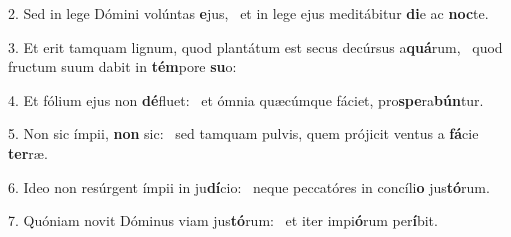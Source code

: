 2. Sed in lege Dómini volúntas \textbf{e}jus, \ast\  et in lege ejus meditábitur \textbf{di}e ac \textbf{noc}te.\

3. Et erit tamquam lignum, quod plantátum est secus decúrsus a\textbf{quá}rum, \ast\  quod fructum suum dabit in \textbf{tém}pore \textbf{su}o:\

4. Et fólium ejus non \textbf{dé}fluet: \ast\  et ómnia quæcúmque fáciet, pro\textbf{spe}ra\textbf{bún}tur.\

5. Non sic ímpii, \textbf{non} sic: \ast\  sed tamquam pulvis, quem prójicit ventus a \textbf{fá}cie \textbf{ter}ræ.\

6. Ideo non resúrgent ímpii in ju\textbf{dí}cio: \ast\  neque peccatóres in concíli\textbf{o} jus\textbf{tó}rum.\

7. Quóniam novit Dóminus viam jus\textbf{tó}rum: \ast\  et iter impi\textbf{ó}rum per\textbf{í}bit.\

